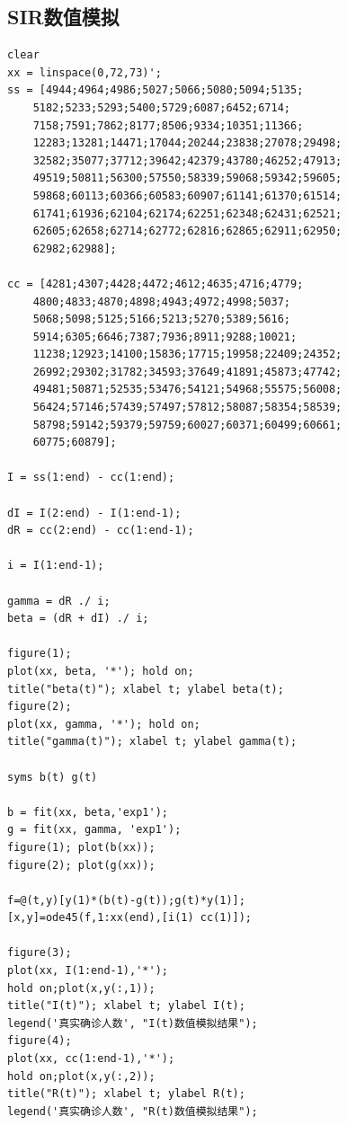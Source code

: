 \documentclass[a4paper]{book}
\numberwithin{equation}{chapter}
\theoremstyle{definition}
\begin{document}
\subsection{SIR数值模拟}
\begin{verbatim}
clear
xx = linspace(0,72,73)';
ss = [4944;4964;4986;5027;5066;5080;5094;5135;
    5182;5233;5293;5400;5729;6087;6452;6714;
    7158;7591;7862;8177;8506;9334;10351;11366;
    12283;13281;14471;17044;20244;23838;27078;29498;
    32582;35077;37712;39642;42379;43780;46252;47913;
    49519;50811;56300;57550;58339;59068;59342;59605;
    59868;60113;60366;60583;60907;61141;61370;61514;
    61741;61936;62104;62174;62251;62348;62431;62521;
    62605;62658;62714;62772;62816;62865;62911;62950;
    62982;62988];

cc = [4281;4307;4428;4472;4612;4635;4716;4779;
    4800;4833;4870;4898;4943;4972;4998;5037;
    5068;5098;5125;5166;5213;5270;5389;5616;
    5914;6305;6646;7387;7936;8911;9288;10021;
    11238;12923;14100;15836;17715;19958;22409;24352;
    26992;29302;31782;34593;37649;41891;45873;47742;
    49481;50871;52535;53476;54121;54968;55575;56008;
    56424;57146;57439;57497;57812;58087;58354;58539;
    58798;59142;59379;59759;60027;60371;60499;60661;
    60775;60879];

I = ss(1:end) - cc(1:end);

dI = I(2:end) - I(1:end-1);
dR = cc(2:end) - cc(1:end-1);

i = I(1:end-1);

gamma = dR ./ i;
beta = (dR + dI) ./ i;

figure(1);
plot(xx, beta, '*'); hold on;
title("beta(t)"); xlabel t; ylabel beta(t);
figure(2);
plot(xx, gamma, '*'); hold on;
title("gamma(t)"); xlabel t; ylabel gamma(t);

syms b(t) g(t)

b = fit(xx, beta,'exp1');
g = fit(xx, gamma, 'exp1');
figure(1); plot(b(xx));
figure(2); plot(g(xx));

f=@(t,y)[y(1)*(b(t)-g(t));g(t)*y(1)];
[x,y]=ode45(f,1:xx(end),[i(1) cc(1)]);

figure(3);
plot(xx, I(1:end-1),'*');
hold on;plot(x,y(:,1));
title("I(t)"); xlabel t; ylabel I(t);
legend('真实确诊人数', "I(t)数值模拟结果");
figure(4);
plot(xx, cc(1:end-1),'*');
hold on;plot(x,y(:,2));
title("R(t)"); xlabel t; ylabel R(t);
legend('真实确诊人数', "R(t)数值模拟结果");
\end{verbatim}
\end{document}
